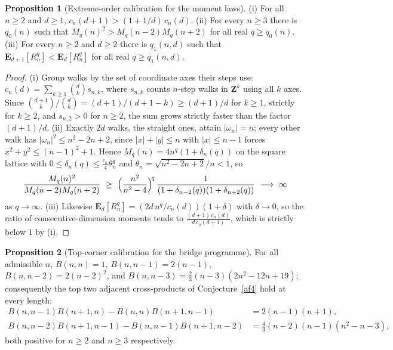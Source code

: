 \documentclass[11pt]{article}
\theoremstyle{definition}
\newtheorem{proposition}{Proposition}
\begin{document}
\begin{proposition}[Extreme-order calibration for the moment laws]\label{af:extreme}
(i) For all $n\ge2$ and $d\ge1$, $c_n(d+1)>(1+1/d)\,c_n(d)$.  (ii) For every $n\ge3$ there is $q_0(n)$ such that $M_q(n)^2>M_q(n-2)M_q(n+2)$ for all real $q\ge q_0(n)$.  (iii) For every $n\ge2$ and $d\ge2$ there is $q_1(n,d)$ such that $\mathbf E_{d+1}[R_n^q]<\mathbf E_d[R_n^q]$ for all real $q\ge q_1(n,d)$.
\end{proposition}

\begin{proof}
(i) Group walks by the set of coordinate axes their steps use: $c_n(d)=\sum_{k\ge1}\binom dk s_{n,k}$, where $s_{n,k}$ counts $n$-step walks in $\mathbf Z^k$ using all $k$ axes.  Since $\binom{d+1}k/\binom dk=(d+1)/(d+1-k)\ge(d+1)/d$ for $k\ge1$, strictly for $k\ge2$, and $s_{n,2}>0$ for $n\ge2$, the sum grows strictly faster than the factor $(d+1)/d$.  (ii) Exactly $2d$ walks, the straight ones, attain $|\omega_n|=n$; every other walk has $|\omega_n|^2\le n^2-2n+2$, since $|x|+|y|\le n$ with $|x|\le n-1$ forces $x^2+y^2\le(n-1)^2+1$.  Hence $M_q(n)=4n^q(1+\delta_n(q))$ on the square lattice with $0\le\delta_n(q)\le\tfrac{c_n}4\theta_n^q$ and $\theta_n=\sqrt{n^2-2n+2}/n<1$, so
\[
\frac{M_q(n)^2}{M_q(n-2)M_q(n+2)}\ \ge\ \Bigl(\frac{n^2}{n^2-4}\Bigr)^{\!q}\,\frac1{(1+\delta_{n-2}(q))(1+\delta_{n+2}(q))}\ \longrightarrow\ \infty
\]
as $q\to\infty$.  (iii) Likewise $\mathbf E_d[R_n^q]=(2d\,n^q/c_n(d))(1+\delta)$ with $\delta\to0$, so the ratio of consecutive-dimension moments tends to $\frac{(d+1)\,c_n(d)}{d\,c_n(d+1)}$, which is strictly below $1$ by (i).
\end{proof}

\begin{proposition}[Top-corner calibration for the bridge programme]\label{af:height}
For all admissible $n$, $B(n,n)=1$, $B(n,n-1)=2(n-1)$, $B(n,n-2)=2(n-2)^2$, and $B(n,n-3)=\tfrac23(n-3)(2n^2-12n+19)$; consequently the top two adjacent cross-products of Conjecture~\ref{af4} hold at every length:
\begin{align*}
B(n,n{-}1)B(n{+}1,n)-B(n,n)B(n{+}1,n{-}1)&=2(n-1)(n+1),\\
B(n,n{-}2)B(n{+}1,n{-}1)-B(n,n{-}1)B(n{+}1,n{-}2)&=\tfrac43(n-2)(n-1)(n^2-n-3),
\end{align*}
both positive for $n\ge2$ and $n\ge3$ respectively.
\end{proposition}
\end{document}
